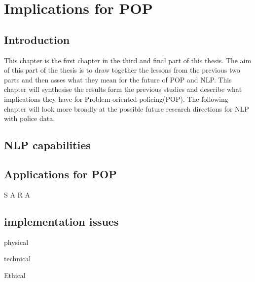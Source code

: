 \chapter{Implications for POP}


\section{Introduction} This chapter is the first chapter in the third and final part of this thesis. The aim of this part of the thesis is to draw together the lessons from the previous two parts and then asses what they mean for the future of POP and NLP.  This chapter will synthesise the results form the previous studies and describe what implications they have for Problem-oriented policing(POP). The following chapter will look more broadly at the possible future research directions for NLP with police data.

\section{NLP capabilities}



\section{Applications for POP}

S
A
R
A

\section{implementation issues}

physical

technical

Ethical


